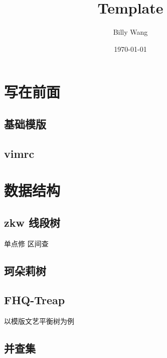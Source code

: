 \documentclass{article}
\title{\textbf{Template}}
\author{Billy Wang}
\date{\today}
\begin{document}
\maketitle
\thispagestyle{fancy}
\tableofcontents
\newpage

\section{写在前面}

\subsection{基础模版}



\subsection{vimrc}



\section{数据结构}

\subsection{zkw 线段树}

单点修 区间查



\subsection{珂朵莉树}



\subsection{FHQ-Treap}

以模版文艺平衡树为例



\subsection{并查集}
\end{document}
